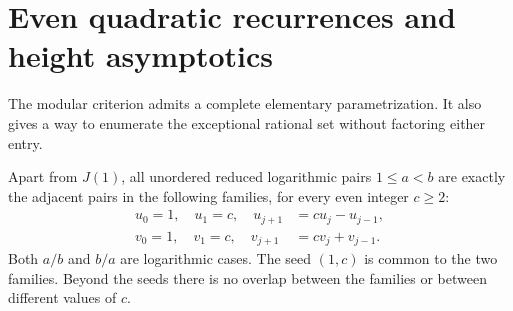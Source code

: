 \section{Even quadratic recurrences and height asymptotics}
\label{sec:recurrences}

The modular criterion admits a complete elementary parametrization.
It also gives a way to enumerate the exceptional rational set without
factoring either entry.

\begin{theorem}\label{thm:recurrences}
Apart from $J(1)$, all unordered reduced logarithmic pairs $1\le a<b$
are exactly the adjacent pairs in the following families, for every even
integer $c\ge2$:
\begin{align}
 u_0=1,\quad u_1=c,\quad u_{j+1}&=c u_j-u_{j-1},\label{eq:minus-rec}\\
 v_0=1,\quad v_1=c,\quad v_{j+1}&=c v_j+v_{j-1}.\label{eq:plus-rec}
\end{align}
Both $a/b$ and $b/a$ are logarithmic cases. The seed $(1,c)$ is common
to the two families. Beyond the seeds there is no overlap between the
families or between different values of $c$.
\end{theorem}
